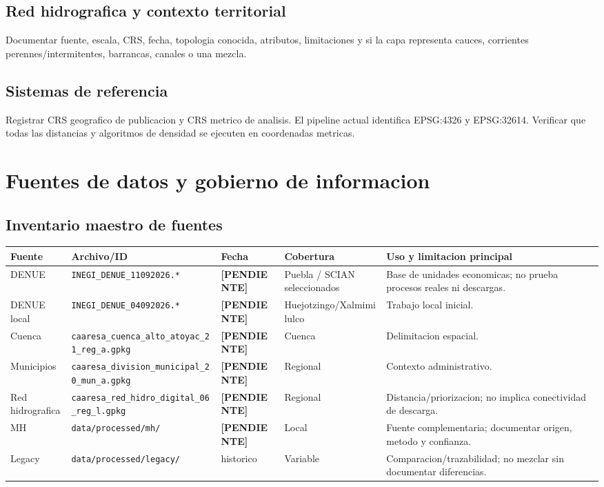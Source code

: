 \documentclass[11pt,letterpaper]{article}
\newcommand{\pendiente}{\textcolor{AtoyacRed}{\textbf{[PENDIENTE]}}}
\newcommand{\ruta}[1]{\texttt{#1}}
\begin{document}
\subsection{Red hidrografica y contexto territorial}
Documentar fuente, escala, CRS, fecha, topologia conocida, atributos, limitaciones y si la capa representa cauces, corrientes perennes/intermitentes, barrancas, canales o una mezcla.

\subsection{Sistemas de referencia}
\begin{evidencia}
Registrar CRS geografico de publicacion y CRS metrico de analisis. El pipeline actual identifica EPSG:4326 y EPSG:32614. Verificar que todas las distancias y algoritmos de densidad se ejecuten en coordenadas metricas.
\end{evidencia}

\section{Fuentes de datos y gobierno de informacion}

\subsection{Inventario maestro de fuentes}
\begin{longtable}{p{}p{}p{}p{}p{}}
\toprule
\textbf{Fuente} & \textbf{Archivo/ID} & \textbf{Fecha} & \textbf{Cobertura} & \textbf{Uso y limitacion principal} \\
\midrule
DENUE & \ruta{INEGI\_DENUE\_11092026.*} & \pendiente & Puebla / SCIAN seleccionados & Base de unidades economicas; no prueba procesos reales ni descargas. \\
DENUE local & \ruta{INEGI\_DENUE\_04092026.*} & \pendiente & Huejotzingo/Xalmimilulco & Trabajo local inicial. \\
Cuenca & \ruta{caaresa\_cuenca\_alto\_atoyac\_21\_reg\_a.gpkg} & \pendiente & Cuenca & Delimitacion espacial. \\
Municipios & \ruta{caaresa\_division\_municipal\_20\_mun\_a.gpkg} & \pendiente & Regional & Contexto administrativo. \\
Red hidrografica & \ruta{caaresa\_red\_hidro\_digital\_06\_reg\_l.gpkg} & \pendiente & Regional & Distancia/priorizacion; no implica conectividad de descarga. \\
MH & \ruta{data/processed/mh/} & \pendiente & Local & Fuente complementaria; documentar origen, metodo y confianza. \\
Legacy & \ruta{data/processed/legacy/} & historico & Variable & Comparacion/trazabilidad; no mezclar sin documentar diferencias. \\
\bottomrule
\end{longtable}
\end{document}
